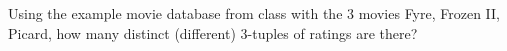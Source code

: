 
Using the example movie database from class with the $3$ movies Fyre, Frozen II, Picard, 
how many distinct (different) $3$-tuples of ratings are there? 
